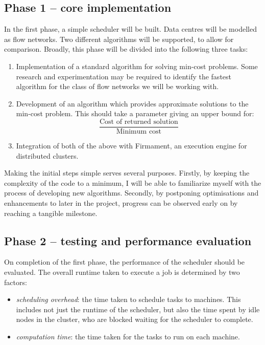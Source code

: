 \subsection*{Phase 1 -- core implementation}
\label{subsec:structure-phase1}

In the first phase, a simple scheduler will be built. Data centres will be modelled as flow networks. Two different algorithms will be supported, to allow for comparison. Broadly, this phase will be divided into the following three tasks:
\begin{enumerate}
  \item Implementation of a standard algorithm for solving min-cost problems. Some research and experimentation may be required to identify the fastest algorithm for the class of flow networks we will be working with.
  \item Development of an algorithm which provides approximate solutions to the min-cost problem. This should take a parameter giving an upper bound for:
\[\frac{\mbox{Cost of returned solution}}{\mbox{Minimum cost}}\]
  \item Integration of both of the above with Firmament, an execution engine for distributed clusters.
\end{enumerate}

Making the initial steps simple serves several purposes. Firstly, by keeping the complexity of the code to a minimum, I will be able to familiarize myself with the process of developing new algorithms. Secondly, by postponing optimisations and enhancements to later in the project, progress can be observed early on by reaching a tangible milestone.

\subsection*{Phase 2 -- testing and performance evaluation}
\label{subsec:structure-phase2}

On completion of the first phase, the performance of the scheduler should be evaluated. The overall runtime taken to execute a job is determined by two factors:

\begin{itemize}
  \item \emph{scheduling overhead}: the time taken to schedule tasks to machines. This includes not just the runtime of the scheduler, but also the time spent by idle nodes in the cluster, who are blocked waiting for the scheduler to complete.
  \item \emph{computation time}: the time taken for the tasks to run on each machine.
\end{itemize}

